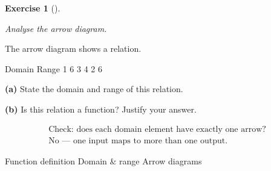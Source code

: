 \documentclass[
  letterpaper,
  DIV=11,
  numbers=noendperiod]{scrreprt}
\theoremstyle{definition}
\newtheorem{exercise}{Exercise}[chapter]
\theoremstyle{remark}
\begin{document}
\begin{exercise}[]\protect\hypertarget{exr-u7-1}{}\label{exr-u7-1}

\emph{Analyse the arrow diagram.}

The arrow diagram shows a relation.

Domain Range 1 6 3 4 2 6

\textbf{(a)} State the domain and range of this relation.

\textbf{(b)} Is this relation a function? Justify your answer.

\begin{tcolorbox}[enhanced jigsaw, opacitybacktitle=0.6, coltitle=black, arc=.35mm, colframe=quarto-callout-tip-color-frame, colback=white, bottomrule=.15mm, left=2mm, colbacktitle=quarto-callout-tip-color!10!white, titlerule=0mm, opacityback=0, title=\textcolor{quarto-callout-tip-color}{\faLightbulb}\hspace{0.5em}{🔍 View Solution}, leftrule=.75mm, breakable, rightrule=.15mm, bottomtitle=1mm, toptitle=1mm, toprule=.15mm]

\[
\begin{aligned}
\text{Check: does each domain element have exactly one arrow?} \\[4pt] \text{No — one input maps to more than one output.}
\end{aligned}
\]

\end{tcolorbox}

{Function definition} {Domain \& range} {Arrow diagrams}

\end{exercise}
\end{document}
